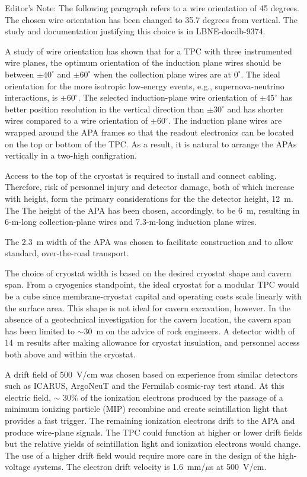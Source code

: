 \begin{editornote}
  Editor's Note:  The following paragraph refers to a wire orientation of 45 degrees.  The chosen wire orientation has been changed to 35.7 degrees from vertical.  The study and documentation justifying this choice is in LBNE-docdb-9374.
\end{editornote}


A study of wire orientation has shown that for a TPC with three instrumented wire planes, the optimum orientation of the induction plane wires should be between $\pm40^\circ$ and $\pm60^\circ$ when the collection plane wires are at $0^\circ$. The ideal orientation for the more isotropic low-energy events, e.g., 
supernova-neutrino interactions, is $\pm60^\circ$. The selected induction-plane wire orientation of $\pm45^\circ$ has better position resolution in the vertical direction than $\pm30^\circ$ and has shorter wires compared to a wire orientation of $\pm60^\circ$.  The induction plane wires are wrapped around the APA frames so that the readout electronics can be located on the top or bottom of the TPC. As a result, it is natural to arrange the APAs vertically in a two-high configration. 

  Access to the top of the cryostat is required to install and connect cabling. Therefore, risk of personnel injury and detector damage, both of which increase with height, form the primary considerations for the the detector height, 12~m. The  The height of the APA has been chosen, accordingly, to be 6~m, resulting in 6-m-long collection-plane wires and 7.3-m-long induction plane wires. 

The 2.3~m width of the APA was chosen to facilitate construction and to allow standard, over-the-road transport. 

The choice of cryostat width is based on the desired cryostat shape and cavern span. From a cryogenics standpoint, the ideal cryostat for a modular TPC would be a cube since membrane-cryostat capital and operating costs scale linearly with the surface area. This shape is not ideal for cavern excavation, however. In the absence of a geotechnical investigation for the cavern location, the cavern span has been limited to $\sim$30~m on the advice of rock engineers. A detector width of 14~m results after making allowance for cryostat insulation, and personnel access both above and within the cryostat. 

A drift field of 500~V/cm was chosen based on experience from similar detectors such as ICARUS, ArgoNeuT and the Fermilab cosmic-ray test stand. At this electric field, $\sim$ 30\% of the ionization electrons produced by the passage of a minimum ionizing particle (MIP) recombine and create scintillation light that provides a fast trigger. The remaining ionization electrons drift to the APA and produce wire-plane signals. The TPC could function at higher or lower drift fields but the relative yields of scintillation light and ionization electrons would change. The use of a higher drift field would require more care in the design of the high-voltage systems. The electron drift velocity is 1.6~mm/$\mu$s at 500~V/cm.

